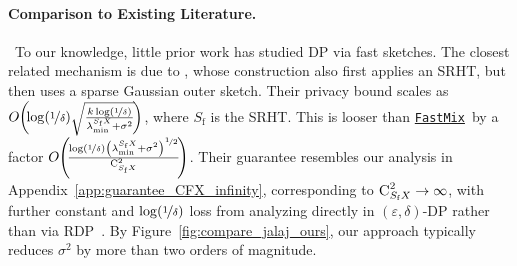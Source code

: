 \documentclass[11pt]{article}
\theoremstyle{definition}
\theoremstyle{plain}
\providecommand{\appendixref}[1]{Appendix~\ref{#1}}
\providecommand{\figureref}[1]{Figure~\ref{#1}}
\newcommand{\eps}{{\varepsilon}}
\newcommand{\RDP}{{\normalfont RDP}~}
\renewcommand{\eps}{\varepsilon}
\newcommand{\FastMix}{\hyperref[alg:fast_mixing]{\texttt{FastMix}}\xspace}
\begin{document}
\paragraph{Comparison to Existing Literature.} \
To our knowledge, little prior work has studied DP via fast sketches. The closest related mechanism is due to \citet{upadhyay2014randomness}, whose construction also first applies an SRHT, but then uses a sparse Gaussian outer sketch. Their privacy bound scales as $O\hspace{-0.2em}\left(\hspace{-0.2em}\log(\nicefrac{1}{\delta})\sqrt{\tfrac{k\log(\nicefrac{1}{\delta})}{\lambda^{S_{\mathrm{f}}X}_{\min}+\sigma^2}}\hspace{-0.15em}\right)$, where $S_{\mathrm{f}}$ is the SRHT. This is looser than \FastMix\ by a factor \(O\hspace{-0.2em}\left(\hspace{-0.2em}\frac{\log(\nicefrac{1}{\delta})\left(\lambda^{S_{\mathrm{f}}X}_{\min}+\sigma^2\right)^{\nicefrac{1}{2}}}{\textsc{C}^2_{S_{\mathrm{f}}X}}\hspace{-0.2em}\right)\). Their guarantee resembles our analysis in \appendixref{app:guarantee_CFX_infinity}, corresponding to $\textsc{C}^2_{S_{\mathrm{f}}X}\to\infty$, with further constant and $\log(\nicefrac{1}{\delta})$ loss from analyzing directly in $(\eps,\delta)$-DP rather than via \RDP. By \figureref{fig:compare_jalaj_ours}, our approach typically reduces $\sigma^2$ by more than two orders of magnitude.
 
\end{document}
